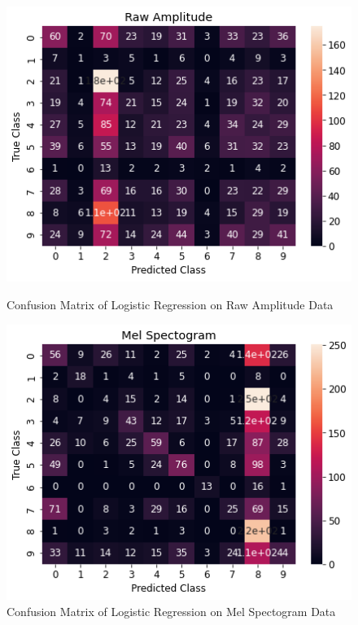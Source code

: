 \documentclass[11pt]{article}
\begin{document}
\begin{figure}[h]
    \centering
    \begin{minipage}{0.45\textwidth}
        \centering
        \includegraphics[width=1\textwidth]{amp_lr_cfm} %
        \caption{Confusion Matrix of Logistic Regression on Raw Amplitude Data}
    \end{minipage}\hfill
    \begin{minipage}{0.45\textwidth}
        \centering
        \includegraphics[width=1\textwidth]{mel_lr_cfm} %
        \caption{Confusion Matrix of Logistic Regression on Mel Spectogram Data}
    \end{minipage}
\end{figure}
\end{document}
